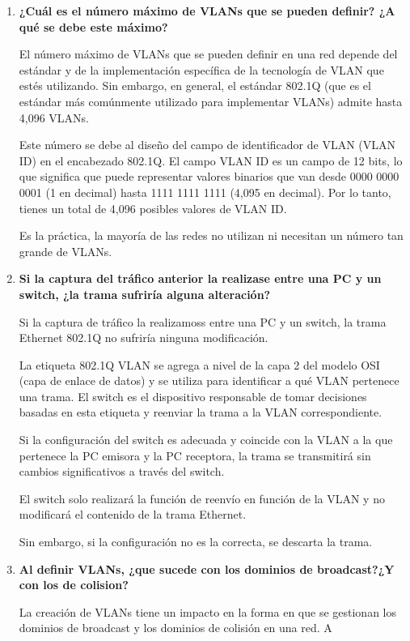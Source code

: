 \documentclass[a4paper]{article}
\begin{document}
\begin{enumerate}
  \item \textbf{¿Cuál es el número máximo de VLANs que se pueden definir? ¿A qué se debe este máximo?}


El número máximo de VLANs que se pueden definir en una red depende del estándar y de la implementación específica de la tecnología de VLAN que estés utilizando. Sin embargo, en general, el estándar 802.1Q (que es el estándar más comúnmente utilizado para implementar VLANs) admite hasta 4,096 VLANs.

Este número se debe al diseño del campo de identificador de VLAN (VLAN ID) en el encabezado 802.1Q. El campo VLAN ID es un campo de 12 bits, lo que significa que puede representar valores binarios que van desde 0000 0000 0001 (1 en decimal) hasta 1111 1111 1111 (4,095 en decimal). Por lo tanto, tienes un total de 4,096 posibles valores de VLAN ID.

Es la práctica, la mayoría de las redes no utilizan ni necesitan un número tan grande de VLANs. 

 \item \textbf{ Si la captura del tráfico anterior la realizase entre una
	PC y un switch, ¿la trama sufriría alguna alteración?}

Si la captura de tráfico la realizamoss entre una PC y un switch, la trama Ethernet 802.1Q no sufriría ninguna modificación.

La etiqueta 802.1Q VLAN se agrega a nivel de la capa 2 del modelo OSI (capa de enlace de datos) y se utiliza para identificar a qué VLAN pertenece una trama. El switch es el dispositivo responsable de tomar decisiones basadas en esta etiqueta y reenviar la trama a la VLAN correspondiente.

Si la configuración del switch es adecuada y coincide con la VLAN a la que pertenece la PC emisora y la PC receptora, la trama se transmitirá sin cambios significativos a través del switch. 

El switch solo realizará la función de reenvío en función de la VLAN y no modificará el contenido de la trama Ethernet.

Sin embargo, si la configuración no es la correcta, se descarta la trama.

\item \textbf{Al definir VLANs, ¿que sucede con los dominios de broadcast?¿Y con los de colision?}

La creación de VLANs tiene un impacto en la forma en que se gestionan los dominios de broadcast y los dominios de colisión en una red. A


\end{enumerate}
\end{document}
